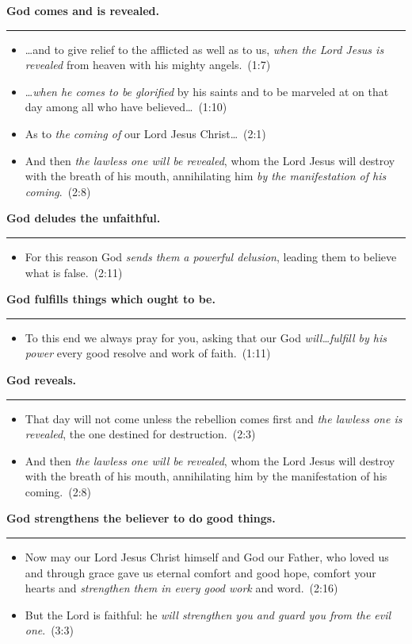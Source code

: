 \documentclass{article}
\newcommand{\godcategory}[1]{\bigskip\noindent \textbf{#1}\smallskip\hrule\nopagebreak}
\newcommand{\elips}{\thinspace\ldots}
\begin{document}
\begin{landscape}
\begin{multicols}{3}
\godcategory{God comes and is revealed.}
\begin{itemize}
  \item \ldots and to give relief to the afflicted as well as to us, \emph{when the Lord Jesus is revealed} from heaven with his mighty angels.~(1:7)
  \item \ldots \emph{when he comes to be glorified} by his saints and to be marveled at on that day among all who have believed\elips~(1:10)
  \item As to \emph{the coming of} our Lord Jesus Christ\elips~(2:1)
  \item And then \emph{the lawless one will be revealed}, whom the Lord Jesus will destroy with the breath of his mouth, annihilating him \emph{by the manifestation of his coming}.~(2:8)
\end{itemize}

\godcategory{God deludes the unfaithful.}
\begin{itemize}
  \item For this reason God \emph{sends them a powerful delusion}, leading them to believe what is false.~(2:11)
\end{itemize}

\godcategory{God fulfills things which ought to be.}
\begin{itemize}
  \item To this end we always pray for you, asking that our God \emph{will\elips fulfill by his power} every good resolve and work of faith.~(1:11)
\end{itemize}

\godcategory{God reveals.}
\begin{itemize}
  \item That day will not come unless the rebellion comes first and \emph{the lawless one is revealed}, the one destined for destruction.~(2:3)
  \item And then \emph{the lawless one will be revealed}, whom the Lord Jesus will destroy with the breath of his mouth, annihilating him by the manifestation of his coming.~(2:8)
\end{itemize}

\godcategory{God strengthens the believer to do good things.}
\begin{itemize}
  \item Now may our Lord Jesus Christ himself and God our Father, who loved us and through grace gave us eternal comfort and good hope, comfort your hearts and \emph{strengthen them in every good work} and word.~(2:16)
  \item But the Lord is faithful: he \emph{will strengthen you and guard you from the evil one}.~(3:3)
\end{itemize}

\end{multicols}
\end{landscape}
\restoregeometry
\end{document}
